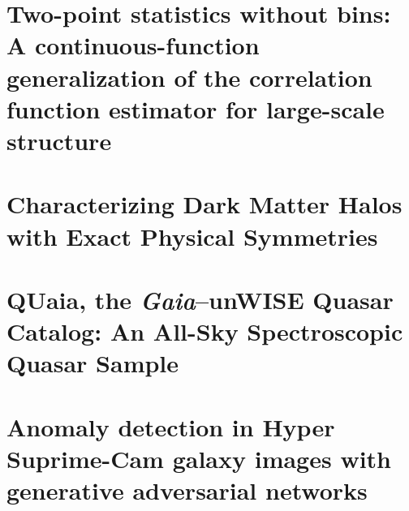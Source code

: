 \documentclass[12pt,oneside,letterpaper]{report}
\begin{document}
\chapter{Two-point statistics without bins: A continuous-function generalization of the correlation function estimator for large-scale structure}
\setcounter{section}{-1}
\label{chp-cfe}
%

\chapter{Characterizing Dark Matter Halos with Exact Physical Symmetries}
\setcounter{section}{-1}
\label{chp-eqcosmo}
%

\chapter{QUaia, the \emph{Gaia}–unWISE Quasar Catalog: An All-Sky Spectroscopic Quasar Sample}
\setcounter{section}{-1}
\label{chp-quaia}
%

\chapter{Anomaly detection in Hyper Suprime-Cam galaxy images with generative adversarial networks}
\setcounter{section}{-1}
\label{chp-anomalies}
%







% 




\cleardoublepage
{}
%



\end{document}
